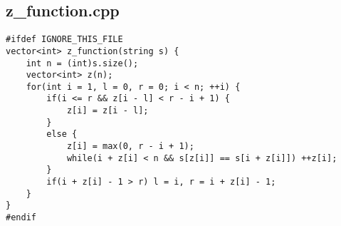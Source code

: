 \documentclass[UTF8, a4paper, titlepage, twoside]{ctexart}
\begin{document}
\subsection{z_function.cpp}
\begin{verbatim}
#ifdef IGNORE_THIS_FILE
vector<int> z_function(string s) {
    int n = (int)s.size();
    vector<int> z(n);
    for(int i = 1, l = 0, r = 0; i < n; ++i) {
        if(i <= r && z[i - l] < r - i + 1) {
            z[i] = z[i - l];
        }
        else {
            z[i] = max(0, r - i + 1);
            while(i + z[i] < n && s[z[i]] == s[i + z[i]]) ++z[i];
        }
        if(i + z[i] - 1 > r) l = i, r = i + z[i] - 1;
    }
}
#endif
\end{verbatim}

\clearpage
\end{document}
